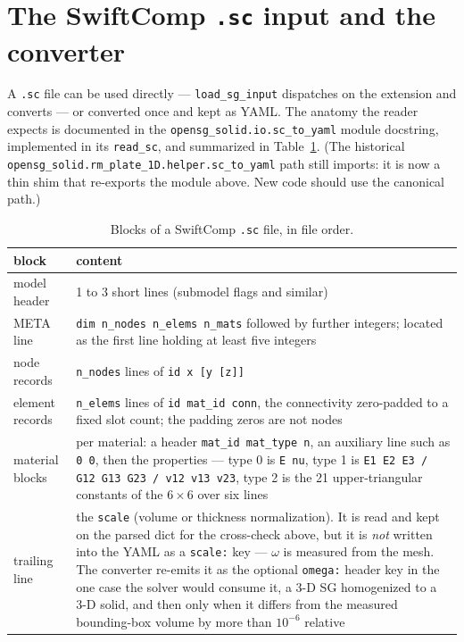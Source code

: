 \section{The SwiftComp \texttt{.sc} input and the converter}
\label{sec:input-sc}

A \texttt{.sc} file can be used directly --- \texttt{load\_sg\_input} dispatches
on the extension and converts --- or converted once and kept as YAML. The
anatomy the reader expects is documented in the
\texttt{opensg\_solid.io.sc\_to\_yaml} module docstring, implemented in its
\texttt{read\_sc}, and summarized in Table~\ref{tab:input-sc}. (The historical
\texttt{opensg\_solid.rm\_plate\_1D.helper.sc\_to\_yaml} path still imports:
it is now a thin shim that re-exports the module above. New code should use the
canonical path.)

\begin{table}[htbp]
\centering
\small
\caption{Blocks of a SwiftComp \texttt{.sc} file, in file order.}
\label{tab:input-sc}
\begin{tabular}{@{}lp{10.2cm}@{}}
\toprule
block & content \\
\midrule
model header & 1 to 3 short lines (submodel flags and similar) \\
META line & \texttt{dim  n\_nodes  n\_elems  n\_mats} followed by further
  integers; located as the first line holding at least five integers \\
node records & \texttt{n\_nodes} lines of \texttt{id  x [y [z]]} \\
element records & \texttt{n\_elems} lines of \texttt{id  mat\_id  conn}, the
  connectivity zero-padded to a fixed slot count; the padding zeros are not
  nodes \\
material blocks & per material: a header \texttt{mat\_id  mat\_type  n}, an
  auxiliary line such as \texttt{0 0}, then the properties --- type 0 is
  \texttt{E  nu}, type 1 is \texttt{E1 E2 E3 / G12 G13 G23 / v12 v13 v23}, type
  2 is the 21 upper-triangular constants of the $6\times6$ over six lines \\
trailing line & the \texttt{scale} (volume or thickness normalization). It is
  read and kept on the parsed dict for the cross-check above, but it is
  \emph{not} written into the YAML as a \texttt{scale:} key --- $\omega$ is
  measured from the mesh. The converter re-emits it as the optional
  \texttt{omega:} header key in the one case the solver would consume it, a
  3-D SG homogenized to a 3-D solid, and then only when it differs from the
  measured bounding-box volume by more than $10^{-6}$ relative \\
\bottomrule
\end{tabular}
\end{table}

